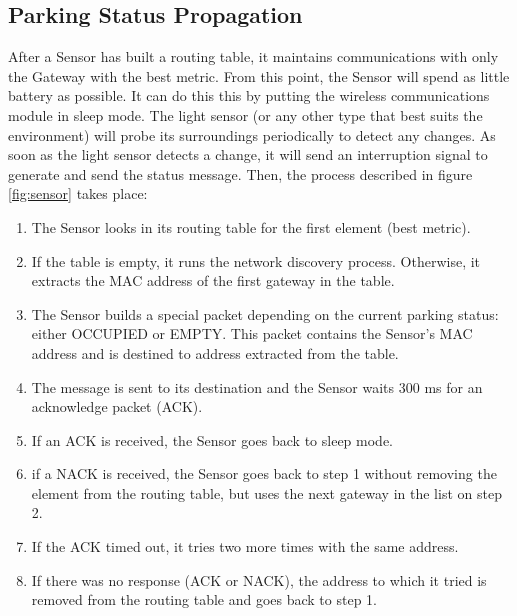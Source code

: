 \subsection{Parking Status Propagation}
\label{sec:parking_status_propagation}
After a Sensor has built a routing table, it maintains communications with only the Gateway with the best metric.
From this point, the Sensor will spend as little battery as possible.
It can do this this by putting the wireless communications module in sleep mode.
The light sensor (or any other type that best suits the environment) will probe its surroundings periodically to detect any changes.
As soon as the light sensor detects a change, it will send an interruption signal to generate and send the status message.
Then, the process described in figure \ref{fig:sensor} takes place:
\begin{enumerate}[noitemsep]
	\item The Sensor looks in its routing table for the first element (best metric).
	\item If the table is empty, it runs the network discovery process.
		Otherwise, it extracts the MAC address of the first gateway in the table.
	\item The Sensor builds a special packet depending on the current parking status: either OCCUPIED or EMPTY.
		This packet contains the Sensor's MAC address and is destined to address extracted from the table.
	\item The message is sent to its destination and the Sensor waits 300 ms for an acknowledge packet (ACK).
	\item If an ACK is received, the Sensor goes back to sleep mode.
	\item if a NACK is received, the Sensor goes back to step 1 without removing the element from the routing table, but uses the next gateway in the list on step 2.
	\item If the ACK timed out, it tries two more times with the same address.
	\item If there was no response (ACK or NACK), the address to which it tried is removed from the routing table and goes back to step 1.
\end{enumerate}

